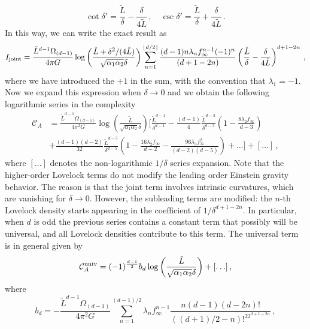 \documentclass[11pt,letterpaper]{article}
\begin{document}
\begin{equation}
\cot\delta'=\frac{\tilde L}{\delta}-\frac{\delta}{4\tilde L}\, ,\quad \csc\delta'=\frac{\tilde L}{\delta}+\frac{\delta}{4\tilde L}\, .
\end{equation}
In this way, we can write the exact result as
\begin{equation}
I_{\rm joint}=\frac{\tilde L^{d-1}\Omega_{(d-1)}}{4\pi G} \log\left(\frac{\tilde L+\delta^2/(4\tilde L)}{\sqrt{\alpha_1\alpha_2}\delta}\right)\sum_{n=1}^{\lfloor d/2\rfloor}\frac{(d-1)n \lambda_n f_{\infty}^{n-1}(-1)^{n}}{(d+1-2n)}\left(\frac{\tilde L}{\delta}-\frac{\delta}{4\tilde L}\right)^{d+1-2n} \, ,
\end{equation}
where we have introduced the $+1$ in the sum, with the convention that $\lambda_1=-1$. Now we expand this expression when $\delta\rightarrow 0$ and we obtain the following logarithmic series in the complexity
\begin{equation}
\begin{aligned}
\mathcal{C}_A&=\frac{\tilde L^{d-1}\Omega_{(d-1)}}{4\pi^2 G}\log\left(\frac{\tilde L}{\sqrt{\alpha_1\alpha_2}\delta}\right)\Bigg[\frac{\tilde L^{d-1}}{\delta^{d-1}}-\frac{(d-1)}{4}\frac{\tilde L^{d-3}}{\delta^{d-3}}\left(1-\frac{8\lambda_2 f_{\infty}}{d-3}\right)\\
&+\frac{(d-1)(d-2)}{32}\frac{\tilde L^{d-5}}{\delta^{d-5}}\left(1-\frac{16\lambda_2 f_{\infty}}{d-2}-\frac{96 \lambda_3f_{\infty}^2}{(d-2)(d-5)}\right)+\ldots\Bigg]+[\ldots]\, ,
\end{aligned}
\end{equation}
where $[\ldots]$ denotes the non-logarithmic $1/\delta$ series expansion. Note that the higher-order Lovelock terms do not modify the leading order Einstein gravity behavior. The reason is that the joint term involves intrinsic curvatures, which are vanishing for $\delta\rightarrow 0$. However, the subleading terms are modified: the $n$-th Lovelock density starts appearing in the coefficient of $1/\delta^{d+1-2n}$. In particular, when $d$ is odd the previous series contains a constant term that possibly will be universal, and all Lovelock densities contribute to this term. The universal term is in general given by
\begin{equation}\label{CAuniv1}
\mathcal{C}_A^{\rm univ}=(-1)^{\frac{d-1}{2}}b_d \log\left(\frac{\tilde L}{\sqrt{\alpha_1\alpha_2}\delta}\right)+[\ldots]\, ,
\end{equation}
where
\begin{equation}\label{Cd}
b_d=-\frac{\tilde L^{d-1}\Omega_{(d-1)}}{4\pi^2 G}\sum_{n=1}^{(d-1)/2}\lambda_n f_{\infty}^{n-1}\frac{n(d-1)(d-2n)!}{((d+1)/2-n)!^22^{d+1-2n}}\, ,
\end{equation}
\end{document}
